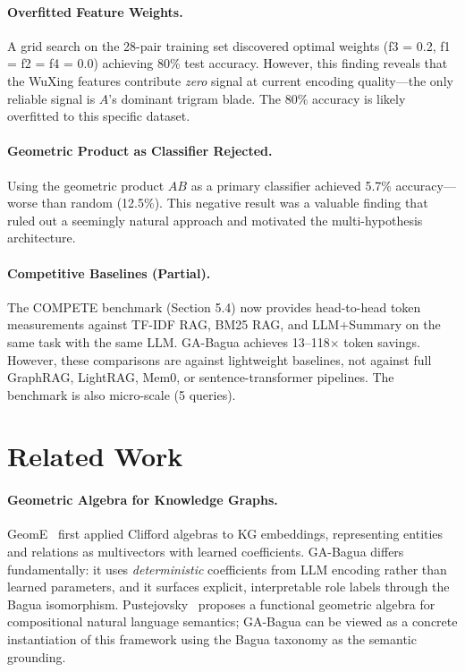 \documentclass[11pt,a4paper]{article}
\begin{document}
\paragraph{Overfitted Feature Weights.} A grid search on the 28-pair training
set discovered optimal weights (f3 = 0.2, f1 = f2 = f4 = 0.0) achieving 80\%
test accuracy. However, this finding reveals that the WuXing features
contribute \emph{zero} signal at current encoding quality---the only reliable
signal is $A$'s dominant trigram blade. The 80\% accuracy is likely overfitted
to this specific dataset.

\paragraph{Geometric Product as Classifier Rejected.} Using the geometric
product $AB$ as a primary classifier achieved 5.7\% accuracy---worse than
random (12.5\%). This negative result was a valuable finding that ruled out a
seemingly natural approach and motivated the multi-hypothesis architecture.

\paragraph{Competitive Baselines (Partial).} The COMPETE benchmark (Section
5.4) now provides head-to-head token measurements against TF-IDF RAG, BM25
RAG, and LLM+Summary on the same task with the same LLM. GA-Bagua achieves
13--118$\times$ token savings. However, these comparisons are against
lightweight baselines, not against full GraphRAG, LightRAG, Mem0, or
sentence-transformer pipelines. The benchmark is also micro-scale (5
queries).

\section{Related Work}

\paragraph{Geometric Algebra for Knowledge Graphs.} GeomE~\cite{xu2020geome}
first applied Clifford algebras to KG embeddings, representing entities and
relations as multivectors with learned coefficients. GA-Bagua differs
fundamentally: it uses \emph{deterministic} coefficients from LLM encoding
rather than learned parameters, and it surfaces explicit, interpretable role
labels through the Bagua isomorphism. Pustejovsky~\cite{pustejovsky2026functional}
proposes a functional geometric algebra for compositional natural language
semantics; GA-Bagua can be viewed as a concrete instantiation of this
framework using the Bagua taxonomy as the semantic grounding.
\end{document}
